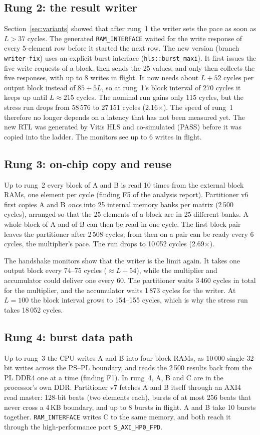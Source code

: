 \documentclass[11pt,a4paper]{article}
\newcommand{\code}[1]{\texttt{#1}}
\begin{document}
\subsection{Rung 2: the result writer}
Section~\ref{sec:variants} showed that after rung~1 the writer sets the pace as soon as $L > 37$ cycles. The generated \code{RAM\_INTERFACE} waited for the write response of every 5-element row before it started the next row. The new version (branch \code{writer-fix}) uses an explicit burst interface (\code{hls::burst\_maxi}). It first issues the five write requests of a block, then sends the 25 values, and only then collects the five responses, with up to 8 writes in flight. It now needs about $L + 52$ cycles per output block instead of $85 + 5L$, so at rung~1's block interval of 270 cycles it keeps up until $L \approx 215$ cycles. The nominal run gains only 115 cycles, but the stress run drops from 58\,576 to 27\,151 cycles (2.16$\times$). The speed of rung~1 therefore no longer depends on a latency that has not been measured yet. The new RTL was generated by Vitis HLS and co-simulated (PASS) before it was copied into the ladder. The monitors see up to 6 writes in flight.

\subsection{Rung 3: on-chip copy and reuse}
Up to rung~2 every block of A and B is read 10 times from the external block RAMs, one element per cycle (finding F5 of the analysis report). Partitioner v6 first copies A and B \emph{once} into 25 internal memory banks per matrix (2\,500 cycles), arranged so that the 25 elements of a block are in 25 different banks. A whole block of A and of B can then be read in one cycle. The first block pair leaves the partitioner after 2\,508 cycles; from then on a pair can be ready every 6 cycles, the multiplier's pace. The run drops to 10\,052 cycles (2.69$\times$).

The handshake monitors show that the writer is the limit again. It takes one output block every 74--75 cycles ($\approx L + 54$), while the multiplier and accumulator could deliver one every 60. The partitioner waits 3\,460 cycles in total for the multiplier, and the accumulator waits 1\,873 cycles for the writer. At $L = 100$ the block interval grows to 154--155 cycles, which is why the stress run takes 18\,052 cycles.

\subsection{Rung 4: burst data path}
Up to rung~3 the CPU writes A and B into four block RAMs, as 10\,000 single 32-bit writes across the PS--PL boundary, and reads the 2\,500 results back from the PL DDR4 one at a time (finding F1). In rung~4, A, B and C are in the processor's own DDR. Partitioner v7 fetches A and B itself through an AXI4 read master: 128-bit beats (two elements each), bursts of at most 256 beats that never cross a 4\,KB boundary, and up to 8 bursts in flight. A and B take 10 bursts together. \code{RAM\_INTERFACE} writes C to the same memory, and both reach it through the high-performance port \code{S\_AXI\_HP0\_FPD}.
\end{document}
